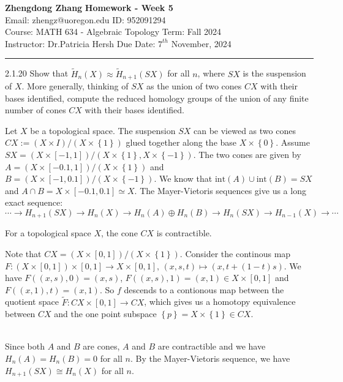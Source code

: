 \documentclass[a4paper, 12pt]{article}
\begin{document}
\noindent
\large\textbf{Zhengdong Zhang} \hfill \textbf{Homework - Week 5}   \\
Email: zhengz@uoregon.edu \hfill ID: 952091294 \\
\normalsize Course: MATH 634 - Algebraic Topology  \hfill Term: Fall 2024\\
Instructor: Dr.Patricia Hersh \hfill Due Date: $7^{th}$ November, 2024 \\
\noindent\rule{7in}{2.8pt}
\begin{problem}{2.1.20}
Show that \(\tilde{H}_n(X)\approx \tilde{H}_{n+1}(SX)\) for all \(n\), where \(SX\) is the suspension of \(X\). More generally, thinking of \(SX\) as the union 
of two cones \(CX\) with their bases identified, compute the reduced homology groups of the union of any finite number of cones \(CX\) with their bases identified. 
\end{problem}
\begin{solution}
Let \(X\) be a topological space. The suspension \(SX\) can be viewed as two cones \(CX:=(X\times I)/(X\times \left\{ 1 \right\})\) glued together along the base \(X\times \left\{ 0 \right\}\). Assume 
\(SX=(X\times [-1,1])/(X\times \left\{ 1 \right\},X\times \left\{ -1 \right\})\). The two cones are given by \(A=(X\times [-0.1,1])/(X\times \left\{ 1 \right\})\) and \(B=(X\times [-1,0.1])/(X\times \left\{ -1 \right\})\). 
We know that \(\text{int}(A)\cup \text{int}(B)=SX\) and \(A\cap B=X\times [-0.1,0.1]\simeq  X\). The Mayer-Vietoris sequences give us a long exact sequence:
\[\cdots\rightarrow H_{n+1}(SX)\rightarrow H_n(X)\rightarrow H_n(A)\oplus H_n(B)\rightarrow H_n(SX)\rightarrow H_{n-1}(X)\rightarrow \cdots\]
\begin{claim}
For a topological space \(X\), the cone \(CX\) is contractible.
\end{claim}
\begin{claimproof}
Note that \(CX=(X\times [0,1])/(X\times \left\{ 1 \right\})\).  Consider the continous map 
\(F:(X\times [0,1])\times [0,1]\rightarrow X\times [0,1],\, (x,s,t)\mapsto (x,t+(1-t)s)\). We have \(F((x,s),0)=(x,s)\), \(F((x,s),1)=(x,1)\in X\times [0,1]\) and \(F((x,1),t)=(x,1)\). So \(f\) descends to a 
contionous map between the quotient space \(\tilde{F}:CX\times [0,1]\rightarrow CX\), which gives us a homotopy equivalence between \(CX\) and the one point subspace \(\left\{ p \right\}=X\times \left\{ 1 \right\}\in CX\).
\end{claimproof}\\ 
Since both \(A\) and \(B\) are cones, \(A\) and \(B\) are contractible and we have \(H_n(A)=H_n(B)=0\) for all \(n\). By the Mayer-Vietoris sequence, we have \(H_{n+1}(SX)\cong H_n(X)\) for all \(n\). 
\end{solution}
\end{document}
